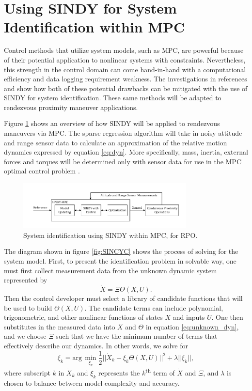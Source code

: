 \documentclass[letterpaper, preprint, paper,11pt]{AAS}	%
\begin{document}
\section{Using SINDY for System Identification within MPC}
Control methods that utilize system models, such as MPC, are powerful because of their potential application to nonlinear systems with constraints. Nevertheless, this strength in the control domain can come hand-in-hand with a computational efficiency and data logging requirement weakness. The investigations in references  and  show how both of these potential drawbacks can be mitigated with the use of SINDY for system identification. These same methods will be adapted to rendezvous proximity maneuver applications.

Figure \ref{fig:SINDY_MPC} shows an overview of how SINDY will be applied to rendezvous maneuvers via MPC. The sparse regression algorithm will take in noisy attitude and range sensor data to calculate an approximation of the relative motion dynamics expressed by equation \eqref{eq:dyn}. More specifically, mass, inertia, external forces and torques will be determined only with sensor data for use in the MPC optimal control problem \cite{KaiserKutz_Sparse}. 
\begin{figure}[h!]
	\centering\includegraphics[width=3.5in]{Figures/SINDY_MPC.pdf}
	\caption{System identification using SINDY within MPC, for RPO.}
	\label{fig:SINDY_MPC}
\end{figure}

The diagram shown in figure \ref{fig:SINCYC} shows the process of solving for the system model. First, to present the identification problem in solvable way, one must first collect measurement data from the unknown dynamic system represented by
\begin{equation}
\label{eq:unknown_dyn}
\dot{X} = \Xi\Theta(X,U).
\end{equation}
Then the control developer must select a library of candidate functions that will be used to build $\Theta(X,U)$. The candidate terms can include polynomial, trigonometric, and other nonlinear functions of states $X$ and inputs $U$. One then substitutes in the measured data into $\dot{X}$ and $\Theta$ in equation \eqref{eq:unknown_dyn}, and we choose $\Xi$ such that we have the minimum number of terms that effectively describe our dynamics. In other words, we solve for  
\begin{equation}
\label{eq:sparse_reg}
\xi_k = \text{arg}\,\min\limits_{\xi_k}\frac{1}{2}||\dot{X}_k-\xi_k\Theta(X,U)||^2+\lambda||\xi_k||, 
\end{equation}
where subscript $k$ in $\dot{X}_k$ and $\xi_k$ represents the $k$\textsuperscript{th} term of $\dot{X}$ and $\Xi$, and $\lambda$ is chosen to balance between model complexity and accuracy.
\end{document}
